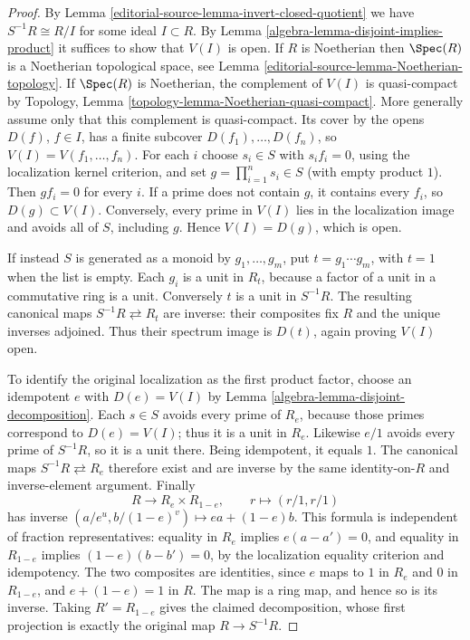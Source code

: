 \begin{proof}
By Lemma \ref{editorial-source-lemma-invert-closed-quotient} we have $S^{-1}R \cong R/I$
for some ideal $I \subset R$. By Lemma \ref{algebra-lemma-disjoint-implies-product}
it suffices to show that $V(I)$ is open.
If $R$ is Noetherian then $\Spec(R)$ is a Noetherian
topological space, see Lemma \ref{editorial-source-lemma-Noetherian-topology}.
If $\Spec(R)$ is Noetherian, the complement of $V(I)$ is
quasi-compact by Topology, Lemma
\ref{topology-lemma-Noetherian-quasi-compact}. More generally assume
only that this complement is quasi-compact. Its cover by the opens
$D(f)$, $f\in I$, has a finite subcover $D(f_1),\ldots,D(f_n)$,
so $V(I)=V(f_1,\ldots,f_n)$. For each $i$ choose $s_i\in S$ with
$s_if_i=0$, using the localization kernel criterion, and set
$g=\prod_{i=1}^n s_i\in S$ (with empty product $1$).
Then $gf_i=0$ for every $i$. If a prime does not contain $g$, it
contains every $f_i$, so $D(g)\subset V(I)$. Conversely, every prime
in $V(I)$ lies in the localization image and avoids all of $S$,
including $g$. Hence $V(I)=D(g)$, which is open.

\medskip\noindent
If instead $S$ is generated as a monoid by $g_1,\ldots,g_m$, put
$t=g_1\cdots g_m$, with $t=1$ when the list is empty.
Each $g_i$ is a unit in $R_t$, because a factor of a unit in a
commutative ring is a unit. Conversely $t$ is a unit in $S^{-1}R$.
The resulting canonical maps $S^{-1}R\rightleftarrows R_t$ are
inverse: their composites fix $R$ and the unique inverses adjoined.
Thus their spectrum image is $D(t)$, again proving $V(I)$ open.

\medskip\noindent
To identify the original localization as the first product factor,
choose an idempotent $e$ with $D(e)=V(I)$ by
Lemma \ref{algebra-lemma-disjoint-decomposition}. Each $s\in S$ avoids every
prime of $R_e$, because those primes correspond to $D(e)=V(I)$;
thus it is a unit in $R_e$. Likewise $e/1$ avoids every prime of
$S^{-1}R$, so it is a unit there. Being idempotent, it equals $1$.
The canonical maps $S^{-1}R\rightleftarrows R_e$ therefore exist and
are inverse by the same identity-on-$R$ and inverse-element argument.
Finally
$$
R\longrightarrow R_e\times R_{1-e},\qquad
r\longmapsto(r/1,r/1)
$$
has inverse $(a/e^u,b/(1-e)^v)\longmapsto ea+(1-e)b$.
This formula is independent of fraction representatives: equality
in $R_e$ implies $e(a-a')=0$, and equality in $R_{1-e}$ implies
$(1-e)(b-b')=0$, by the localization equality criterion and
idempotency. The two composites are identities, since $e$ maps to
$1$ in $R_e$ and $0$ in $R_{1-e}$, and $e+(1-e)=1$ in $R$.
The map is a ring map, and hence so is its inverse. Taking
$R'=R_{1-e}$ gives the claimed decomposition, whose first projection
is exactly the original map $R\to S^{-1}R$.
\end{proof}



